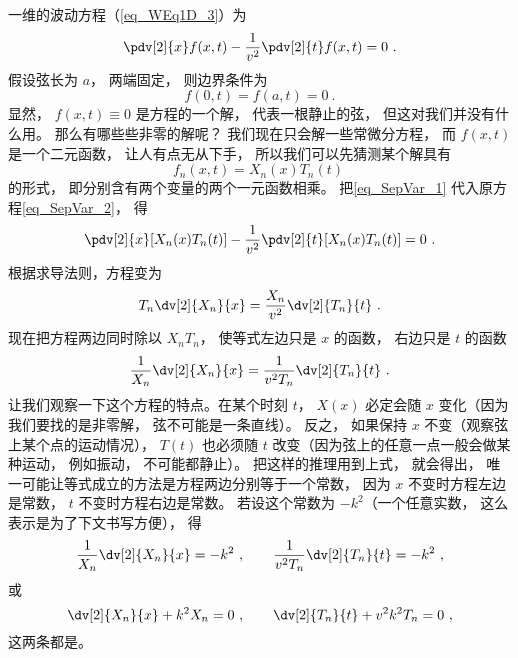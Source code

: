 一维的波动方程（\autoref{eq_WEq1D_3}）为
\begin{equation}
\pdv[2]{x} f(x, t) - \frac{1}{v^2} \pdv[2]{t}f(x, t) = 0~.
\end{equation}
假设弦长为 $a$， 两端固定， 则边界条件为
\begin{equation}\label{eq_SepVar_3}
f(0, t) = f(a, t) = 0~.
\end{equation}
显然， $f(x, t) \equiv 0$ 是方程的一个解， 代表一根静止的弦， 但这对我们并没有什么用。 那么有哪些些非零的解呢？ 我们现在只会解一些常微分方程， 而 $f(x, t)$ 是一个二元函数， 让人有点无从下手， 所以我们可以先猜测某个解具有
\begin{equation}\label{eq_SepVar_1}
f_n(x, t) = X_n(x) T_n(t)~
\end{equation}
的形式， 即分别含有两个变量的两个一元函数相乘。 把\autoref{eq_SepVar_1} 代入原方程\autoref{eq_SepVar_2}， 得
\begin{equation}
\pdv[2]{x}[X_n(x)T_n(t)] - \frac{1}{v^2}\pdv[2]{t} [X_n(x) T_n(t)] = 0~.
\end{equation}
根据求导法则，方程变为
\begin{equation}
T_n\dv[2]{X_n}{x} = \frac{X_n}{v^2} \dv[2]{T_n}{t}~.
\end{equation}
现在把方程两边同时除以 $X_nT_n$， 使等式左边只是 $x$ 的函数， 右边只是 $t$ 的函数
\begin{equation}
\frac{1}{X_n}\dv[2]{X_n}{x} = \frac{1}{v^2 T_n} \dv[2]{T_n}{t}~.
\end{equation}
让我们观察一下这个方程的特点。在某个时刻 $t$， $X(x)$ 必定会随 $x$ 变化（因为我们要找的是非零解， 弦不可能是一条直线）。 反之， 如果保持 $x$ 不变（观察弦上某个点的运动情况）， $T(t)$ 也必须随 $t$ 改变（因为弦上的任意一点一般会做某种运动， 例如振动， 不可能都静止）。 把这样的推理用到上式， 就会得出， 唯一可能让等式成立的方法是方程两边分别等于一个常数， 因为 $x$ 不变时方程左边是常数，  $t$ 不变时方程右边是常数。 若设这个常数为 $-k^2$（一个任意实数， 这么表示是为了下文书写方便）， 得
\begin{equation}
\frac{1}{X_n}\dv[2]{X_n}{x} = -k^2~,
\qquad
\frac{1}{v^2 T_n}\dv[2]{T_n}{t} = -k^2~,
\end{equation}
或
\begin{equation}
\dv[2]{X_n}{x} + k^2 X_n = 0~,
\qquad
\dv[2]{T_n}{t} + v^2k^2 T_n = 0~,
\end{equation}
这两条都是。

